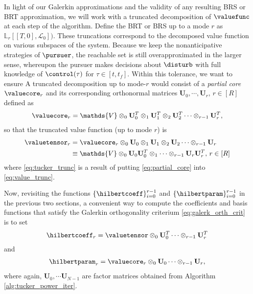 In light of our Galerkin approximations and the validity of any resulting BRS or BRT approximation, we will work with a truncated decomposition of $\valuefunc$ at each step of the algorithm. Define the BRT or BRS up to a mode $r$ as $\mathds{L}_r\left[\left[T, 0\right], \mathcal{L}_0\right])$. These truncations correspond to the  decomposed value function on various subspaces of the system. Because we keep the nonanticipative  strategies of $\pursuer$, the reachable set is still overapproximated in the larger sense, whereupon the pursuer makes decisions about $\disturb$ with full knowledge of $\control(\tau)$ for $\tau \in \left[t, t_f\right]$. Within this tolerance, we want to ensure  A truncated decomposition up to mode-$r$ would consist of a \textit{partial core} $\valuecore_r$ and its corresponding orthonormal matrices $\bm{U}_0, \cdots, \bm{U}_r$, $r \in \left[R \right]$ defined as 
%
\begin{align}
	\valuecore_r = \mathds{V} \otimes_0  \mathbf{U}_0^T \otimes_1 \mathbf{U}_1^T \otimes_2 \mathbf{U}_2^T \cdots \otimes_{r-1} \mathbf{U}_{r}^T,
	\label{eq:partial_core}
\end{align}
%
so that the truncated value function (up to mode $r$) is 
%
\begin{subequations}
	\begin{align}
		\valuetensor_r &= \valuecore_r \otimes_0 \mathbf{U}_0 \otimes_1 \mathbf{U}_1 \otimes_2 \mathbf{U}_2 \cdots \otimes_{r-1} \mathbf{U}_{r} \label{eq:value_trunc} \\
		&\equiv  \mathds{V} \otimes_0  \mathbf{U}_0\mathbf{U}_0^T \otimes_1  \cdots \otimes_{r-1} \mathbf{U}_{r}\mathbf{U}_r^T, \, r \in \left[R\right]
		\label{eq:tucker_trunc} 
	\end{align}
\end{subequations}
%
where \eqref{eq:tucker_trunc} is a result of putting \eqref{eq:partial_core} into \eqref{eq:value_trunc}.  

Now, revisiting the functions $\{\hilbertcoeff\}_{i=0}^{r-1}$ and $\{\hilbertparam\}_{i=0}^{r-1}$ in the previous two sections, a convenient way to compute the coefficients and basis functions that satisfy the Galerkin orthogonality criterium \eqref{eq:galerk_orth_crit} is to set 
%
\begin{align}
	\hilbertcoeff_r = \valuetensor \otimes_0 \mathbf{U}_0^T \cdots \otimes_{r-1} \mathbf{U}_r^T
	\label{eq:hilbert_coeff_compute}
\end{align}
%
and 
%
\begin{align}
	\hilbertparam_r = \valuecore_{r} \otimes_0 \mathbf{U}_0 \cdots \otimes_{r-1} \mathbf{U}_r,
	\label{eq:hilbert_basis_compute}
\end{align}
%
where again, $\mathbf{U}_0, \cdots \mathbf{U}_{N-1}$ are factor matrices obtained from Algorithm \ref{alg:tucker_power_iter}.

